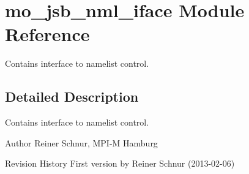 \hypertarget{namespacemo__jsb__nml__iface}{}\section{mo\+\_\+jsb\+\_\+nml\+\_\+iface Module Reference}
\label{namespacemo__jsb__nml__iface}


Contains interface to namelist control.  




\subsection{Detailed Description}
Contains interface to namelist control. 

\begin{DoxyAuthor}{Author}
Reiner Schnur, M\+P\+I-\/\+M Hamburg
\end{DoxyAuthor}
\begin{DoxyParagraph}{Revision History}
First version by Reiner Schnur (2013-\/02-\/06) 
\end{DoxyParagraph}
